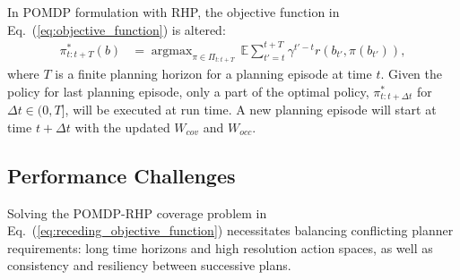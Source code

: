 \documentclass[letterpaper]{article} %
\newcommand{\phdone}[1]{} %
\newcommand{\argmax}{\mathop{\mathrm{argmax}}}
\begin{document}
\phdone{RHP Objective Function}
In POMDP formulation with RHP, the objective function in Eq.~(\ref{eq:objective_function}) is altered:
\begin{align}
  \pi_{t:t+T}^*(b) &= \argmax_{\pi \in \Pi_{t:t+T}} \, \mathbb{E} \sum_{t'=t}^{t+T} \gamma^{t'-t} r(b_{t'}, \pi(b_{t'})),
  \label{eq:receding_objective_function}
\end{align}
where $T$ is a finite planning horizon for a planning episode at time $t$.
Given the policy for last planning episode, only a part of the optimal policy, $\pi^*_{t:t+\Delta t}$ for $\Delta t \in (0, T]$, will be executed at run time. A new planning episode will start at time $t+\Delta t$ with the updated $W_{cov}$ and $W_{occ}$.







\subsection{Performance Challenges} \label{ssec:challenges}
Solving the POMDP-RHP coverage problem in Eq.~(\ref{eq:receding_objective_function}) necessitates balancing conflicting planner requirements: long time horizons and high resolution action spaces, as well as consistency and resiliency between successive plans.
\end{document}
